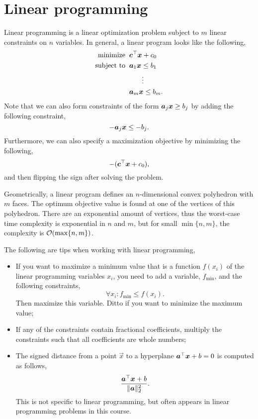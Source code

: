 \documentclass[justified,nobib]{tufte-handout}
\begin{document}
\section{Linear programming}


Linear programming is a linear optimization problem subject to $m$ linear
constraints on $n$ variables. In general, a linear program looks like the following,
\begin{align*}
    \text{minimize} \;\;   & \transpose{\vec{c}} \vec{x} + c_0        \\
    \text{subject to} \;\; & \mat{a}_1 \vec{x} \leq b_1               \\
                           & \vdotswithin{\mat{a}_1 \vec{x} \leq b_1} \\
                           & \mat{a}_m \vec{x} \leq b_m.
\end{align*}
Note that we can also form constraints of the form $\bm{a}_j \bm{x} \geq b_j$
by adding the following constraint, \[
    -\bm{a}_j \bm{x} \leq -b_j.
\]
Furthermore, we can also specify a maximization objective by minimizing the
following, \[
    -(\bm{c}^\top \bm{x} + c_0),
\]
and then flipping the sign after solving the problem.

Geometrically, a linear program defines an $n$-dimensional convex polyhedron
with $m$ faces. The optimum objective value is found at one of the vertices of
this polyhedron. There are an exponential amount of vertices, thus the
worst-case time complexity is exponential in $n$ and $m$, but for small $\min
    \{ n,m \}$, the complexity is $\bigo{\max\{ n,m \}}$.

The following are tips when working with linear programming,
\begin{itemize}
    \item If you want to maximize a minimum value that is a function $f(x_i)$ of
          the linear programming variables $x_i$, you need to add a variable,
          $f_{\min}$, and the following constraints, \[
              \forall x_i : f_{\min} \leq f(x_i).
          \]
          Then maximize this variable. Ditto if you want to minimize the maximum
          value;

    \item If any of the constraints contain fractional coefficients, multiply the
          constraints such that all coefficients are whole numbers;

    \item The signed distance from a point $\vec{x}$ to a hyperplane
          $\bm{a}^\top\bm{x} + b = 0$ is computed as follows, \[
              \frac{\bm{a}^\top\bm{x} + b}{\lVert \bm{a} \rVert_2^2}.
          \]
          This is not specific to linear programming, but often appears in linear
          programming problems in this course.
\end{itemize}
\end{document}
